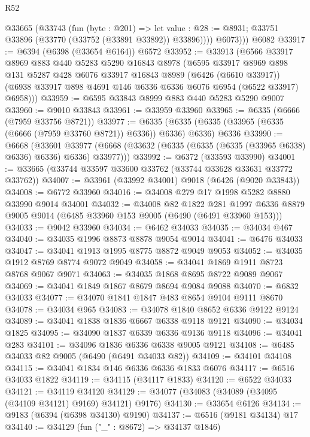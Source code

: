 \begin{lexlean}{R52}
\begin{coremodule}
        @33665
          (@33743
            (fun (byte : @201) =>
            let value : @28 := @8931; @33751 @33896 (@33770 (@33752 (@33891 @33892)) @33896))))
          @6073)))
    @6082
@33917 := @6394 (@6398 (@33654 @6164)) @6572
@33952 := @33913
    (@6566
      @33917
      @8969
      @883
      @440
      @5283
      @5290
      @16843
      @8978
      (@6595
        @33917
        @8969
        @898
        @131
        @5287
        @428
        @6076
        @33917
        @16843
        @8989
        (@6426 (@6610 @33917))
        (@6938 @33917 @898 @4691 @146 @6336 @6336 @6076 @6954 (@6522 @33917) @6958)))
@33959 := @6595 @33843 @8999 @883 @440 @5283 @5290 @9007
@33960 := @9010 @33843
@33961 := @33959 @33960
@33965 := @6335 (@6666 (@7959 @33756 @8721))
@33977 := @6335
    (@6335 (@6335 (@33965 (@6335 (@6666 (@7959 @33760 @8721)) @6336)) @6336) @6336)
    @6336
@33990 := @6668
    (@33601 @33977 (@6668 (@33632 (@6335 (@6335 (@6335 (@33965 @6338) @6336) @6336) @6336) @33977)))
@33992 := @6372 (@33593 @33990)
@34001 := @33665 (@33744 @33597 @33600 @33762 (@33744 @33628 @33631 @33772 @33762))
@34007 := @33961 (@33992 @34001) @9018 (@6426 (@9020 @33843))
@34008 := @6772 @33960
@34016 := @34008 @279 @17 @1998 @5282 @8880 @33990 @9014 @34001
@34032 := @34008
    @82
    @1822
    @281
    @1997
    @6336
    @8879
    @9005
    @9014
    (@6485 @33960 @153 @9005 (@6490 (@6491 @33960 @153)))
@34033 := @9042 @33960
@34034 := @6462 @34033
@34035 := @34034 @467
@34040 := @34035 @1996 @8873 @8878 @9054 @9014
@34041 := @6476 @34033
@34047 := @34041 @1913 @1995 @8775 @8872 @9049 @9053
@34052 := @34035 @1912 @8769 @8774 @9072 @9049
@34058 := @34041 @1869 @1911 @8723 @8768 @9067 @9071
@34063 := @34035 @1868 @8695 @8722 @9089 @9067
@34069 := @34041 @1849 @1867 @8679 @8694 @9084 @9088
@34070 := @6832 @34033
@34077 := @34070 @1841 @1847 @483 @8654 @9104 @9111 @8670
@34078 := @34034 @965
@34083 := @34078 @1840 @8652 @6336 @9122 @9124
@34089 := @34041 @1838 @1836 @6667 @6338 @9118 @9121
@34090 := @34034 @1825
@34095 := @34090 @1837 @6339 @6336 @9136 @9118
@34096 := @34041 @283
@34101 := @34096 @1836 @6336 @6338 @9005 @9121
@34108 := @6485 @34033 @82 @9005 (@6490 (@6491 @34033 @82))
@34109 := @34101 @34108
@34115 := @34041 @1834 @146 @6336 @6336 @1833 @6076
@34117 := @6516 @34033 @1822
@34119 := @34115 (@34117 @1833)
@34120 := @6522 @34033
@34121 := @34119 @34120
@34129 := @34077 (@34083 (@34089 (@34095 (@34109 @34121) @9169) @34121) @9176)
@34130 := @33654 @6126
@34134 := @9183 (@6394 (@6398 @34130) @9190)
@34137 := @6516 (@9181 @34134) @17
@34140 := @34129 (fun ("_" : @8672) => @34137 @1846)

\end{coremodule}
\end{lexlean}
